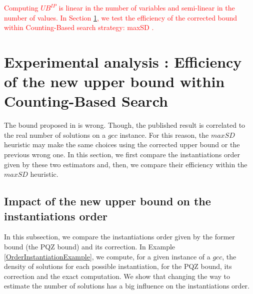 \documentclass[jair,twoside,11pt,theapa]{article}
\newtheorem{proposition}[theorem]{Proposition}
\newcommand{\major}[1]{\textcolor{red}{#1}}
\newcommand{\noteXavier}[1]  {{\color{blue}{\sc \scriptsize [Xavier: #1]}}}
\begin{document}

\major{Computing $UB^{IP}$ is linear in the number of variables and semi-linear in the number of values. In Section \ref{expe}, we test the efficiency of the corrected bound within Counting-Based search strategy: maxSD \cite{PesantQZ12}.}


\section{Experimental analysis : Efficiency of the new upper bound within Counting-Based Search}
\label{expe}

The bound proposed in \cite{PesantQZ12} is wrong. Though, the published result is correlated to the real number of solutions on a $gcc$ instance. For this reason, the $maxSD$ heuristic may make the same choices using the corrected upper bound or the previous wrong one. In this section, we first compare the instantiations order given by these two estimators and, then, we compare their efficiency within the $maxSD$ heuristic.

\subsection{Impact of the new upper bound on the instantiations order}
In this subsection, we compare the instantiations order given by the former bound (the PQZ bound) and its correction. In Example \ref{OrderInstantiationExample}, we compute, for a given instance of a $gcc$, the density of solutions for each possible instantiation, for the PQZ bound, its correction and the exact computation. We show that changing the way to estimate the number of solutions has a big influence on the instantiations order. 
\end{document}
